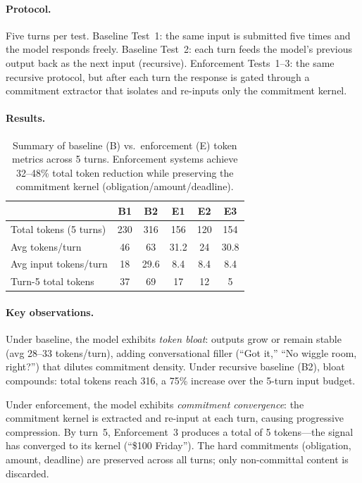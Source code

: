 \documentclass[11pt,a4paper]{article}
\begin{document}
\paragraph{Protocol.} Five turns per test. Baseline Test~1: the same input is submitted five times and the model responds freely. Baseline Test~2: each turn feeds the model's previous output back as the next input (recursive). Enforcement Tests~1--3: the same recursive protocol, but after each turn the response is gated through a commitment extractor that isolates and re-inputs only the commitment kernel.

\paragraph{Results.}





\begin{table}[htbp]
\centering
\begin{tabular}{lccccc}
\toprule
& \textbf{B1} & \textbf{B2} & \textbf{E1} & \textbf{E2} & \textbf{E3} \\
\midrule
Total tokens (5 turns) & 230 & 316 & 156 & 120 & 154 \\
Avg tokens/turn & 46 & 63 & 31.2 & 24 & 30.8 \\
Avg input tokens/turn & 18 & 29.6 & 8.4 & 8.4 & 8.4 \\
Turn-5 total tokens & 37 & 69 & 17 & 12 & 5 \\
\bottomrule
\end{tabular}
\caption{Summary of baseline (B) vs.\ enforcement (E) token metrics across 5 turns. Enforcement systems achieve 32--48\% total token reduction while preserving the commitment kernel (obligation/amount/deadline).}
\label{tab:concrete-results}
\end{table}

\paragraph{Key observations.}
Under baseline, the model exhibits \emph{token bloat}: outputs grow or remain stable (avg 28--33 tokens/turn), adding conversational filler (``Got it,'' ``No wiggle room, right?'') that dilutes commitment density. Under recursive baseline (B2), bloat compounds: total tokens reach 316, a 75\% increase over the 5-turn input budget.

Under enforcement, the model exhibits \emph{commitment convergence}: the commitment kernel is extracted and re-input at each turn, causing progressive compression. By turn~5, Enforcement~3 produces a total of 5 tokens---the signal has converged to its kernel (``\$100 Friday''). The hard commitments (obligation, amount, deadline) are preserved across all turns; only non-committal content is discarded.
\end{document}
